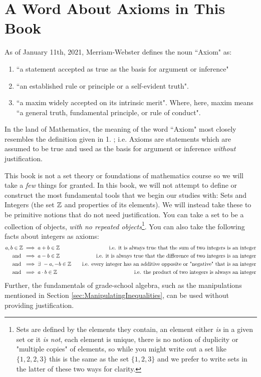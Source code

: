\section{A Word About Axioms in This Book}
\label{sec:axioms}
As of January 11th, 2021, Merriam-Webster defines the noun ``Axiom" as:
\begin{enumerate}
    \item ``a statement accepted as true as the basis for argument or inference"
    \item ``an established rule or principle or a self-evident truth".
    \item ``a maxim widely accepted on its intrinsic merit". Where, here, maxim means ``a general truth, fundamental principle, or rule of conduct".
\end{enumerate}
In the land of Mathematics, the meaning of the word ``Axiom" most closely resembles the definition given in 1. ; i.e. Axioms are statements which are assumed to be true and used as the basis for argument or inference \textit{without} justification. 

This book is not a set theory or foundations of mathematics course so we will take a \textit{few} things for granted. In this book, we will not attempt to define or construct the most fundamental tools that we begin our studies with: Sets and Integers (the set ${\mathbb{ Z}}$ and properties of its elements). We will instead take these to be primitive notions that do not need justification. You can take a set to be a collection of objects, \textit{with no repeated objects}\footnote{Sets are defined by the elements they contain, an element either \textit{is} in a given set or it \textit{is not}, each element is unique, there is no notion of duplicity or "multiple copies" of elements, so while you might write out a set like $\{1, 2, 2, 3\}$ this is the same as the set $\{1,2,3\}$ and we prefer to write sets in the latter of these two ways for clarity.}. You can also take the following facts about integers as axioms:
\noindent\begin{align}
    a,b\in \Z &\implies a+b\in \Z  \ \ \ &\text{i.e. it is always true that the sum of two integers is an integer}\nonumber \\
    \text{ and } &\implies a-b\in \Z \ \ \ &\text{i.e. it is always true that the difference of two integers is an integer}\nonumber \\
    \text{ and } &\implies \exists \ -a,-b \in \Z \ \ \ &\text{i.e. every integer has an additive opposite or "negative" that is an integer}\nonumber \\
     \text{ and } &\implies a\cdot b\in \Z \ \ \ &\text{i.e. the product of two integers is always an integer}\nonumber
\end{align} 
Further, the fundamentals of grade-school algebra, such as the manipulations mentioned in Section \ref{sec:ManipulatingInequalities}, can be used without providing justification.


